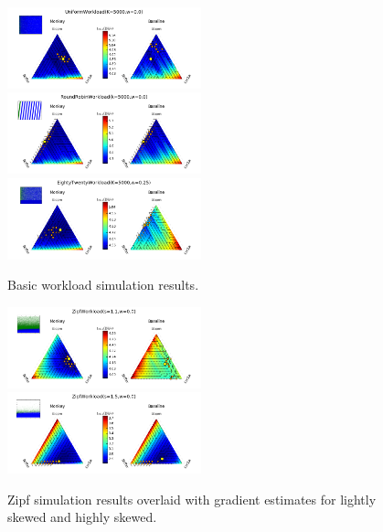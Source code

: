 \documentclass{cidr-2019}
\begin{document}
\begin{figure}[!htb]
\begin{center}
\includegraphics[width=0.5\textwidth]{uniformquiv1.png}
\includegraphics[width=0.5\textwidth]{robinquiv1.png}
\includegraphics[width=0.5\textwidth]{eightwenquiv2.png}
\end{center}
\caption{Basic workload simulation results.}
\end{figure}

\begin{figure}[!htb]
\begin{center}
\includegraphics[width=0.5\textwidth]{zipfquiv1.png}
\includegraphics[width=0.5\textwidth]{zipfquiv2.png}
\end{center}
\caption{Zipf simulation results overlaid with gradient estimates for lightly skewed and highly skewed.}
\end{figure}
\end{document}
